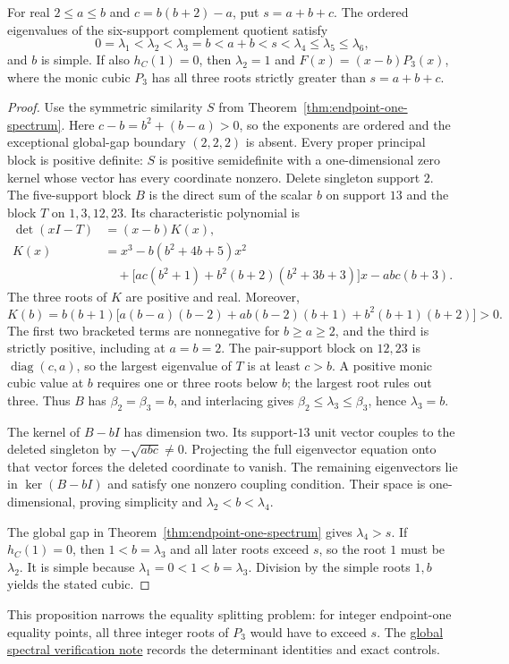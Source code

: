 \begin{proposition}
\label{prop:endpoint-one-equality-spectrum}
For real $2\leq a\leq b$ and $c=b(b+2)-a$, put $s=a+b+c$. The ordered eigenvalues
of the six-support complement quotient satisfy
\[
 0=\lambda_1<\lambda_2<\lambda_3=b<a+b<s
 <\lambda_4\leq\lambda_5\leq\lambda_6,
\]
and $b$ is simple. If also $h_C(1)=0$, then $\lambda_2=1$ and
$F(x)=(x-b)P_3(x)$, where the monic cubic $P_3$ has all three roots
strictly greater than $s=a+b+c$.
\end{proposition}

\begin{proof}
Use the symmetric similarity $S$ from Theorem~\ref{thm:endpoint-one-spectrum}.
Here $c-b=b^2+(b-a)>0$, so the exponents are ordered and the
exceptional global-gap boundary $(2,2,2)$ is absent.
Every proper principal block is positive definite: $S$ is positive
semidefinite with a one-dimensional zero kernel whose vector has every
coordinate nonzero. Delete singleton support $2$. The five-support block
$B$ is the direct sum of the scalar $b$ on support $13$ and the block $T$
on $1,3,12,23$. Its characteristic polynomial is
\begin{align*}
 \det(xI-T)&=(x-b)K(x),\\
 K(x)&=x^3-b(b^2+4b+5)x^2\\
 &\quad+\bigl[ac(b^2+1)+b^2(b+2)(b^2+3b+3)\bigr]x-abc(b+3).
\end{align*}
The three roots of $K$ are positive and real. Moreover,
\[
 K(b)=b(b+1)\bigl[a(b-a)(b-2)+ab(b-2)(b+1)+b^2(b+1)(b+2)\bigr]>0.
\]
The first two bracketed terms are nonnegative for $b\geq a\geq2$,
and the third is strictly positive, including at $a=b=2$.
The pair-support block on $12,23$ is $\operatorname{diag}(c,a)$, so
the largest eigenvalue of $T$ is at least $c>b$. A positive monic cubic
value at $b$ requires one or three roots below $b$; the largest root
rules out three. Thus $B$ has $\beta_2=\beta_3=b$, and interlacing gives
$\beta_2\leq\lambda_3\leq\beta_3$, hence $\lambda_3=b$.

The kernel of $B-bI$ has dimension two. Its support-$13$ unit vector
couples to the deleted singleton by $-\sqrt{abc}\ne0$. Projecting the
full eigenvector equation onto that vector forces the deleted coordinate
to vanish. The remaining eigenvectors lie in $\ker(B-bI)$ and satisfy
one nonzero coupling condition. Their space is one-dimensional, proving
simplicity and $\lambda_2<b<\lambda_4$.

The global gap in Theorem~\ref{thm:endpoint-one-spectrum} gives
$\lambda_4>s$. If $h_C(1)=0$, then $1<b=\lambda_3$ and all
later roots exceed $s$, so the root $1$ must be $\lambda_2$.
It is simple because $\lambda_1=0<1<b=\lambda_3$.
Division by the simple roots $1,b$ yields the stated cubic.
\end{proof}

This proposition narrows the equality splitting problem: for integer
endpoint-one equality points, all three integer roots of $P_3$ would have
to exceed $s$. The
\href{https://github.com/the-omega-institute/ideal-intersection-laplacian/blob/4a451ac51055c6d04926967749196f12ac8e49c8/notes/total-sum-spectral-gap.md}{global spectral verification note}
records the determinant identities and exact controls.

